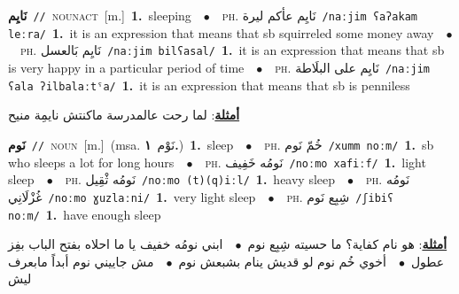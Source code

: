 \documentclass[10pt,a4paper,twoside]{article} %
\begin{document}
\begin{multicols}{2}
{\setlength\topsep{0pt}\textbf{\foreignlanguage{arabic}{نَايِم}}\ {\color{gray}\texttt{//}\color{black}}\ \textsc{noun\textunderscore act}\ [m.]\ \textbf{1.}~sleeping\ \ $\bullet$\ \ \textsc{ph.} \color{gray} \foreignlanguage{arabic}{نَايِم عأكم ليرة}\color{black}\ {\color{gray}\texttt{/{\sffamily naːjim ʕaʔakam leːra}/}\color{black}}\ \textbf{1.}~it is an expression that means that sb squirreled some money away\ \ $\bullet$\ \ \textsc{ph.} \color{gray} \foreignlanguage{arabic}{نَايِم بَالعسل}\color{black}\ {\color{gray}\texttt{/{\sffamily naːjim bilʕasal}/}\color{black}}\ \textbf{1.}~it is an expression that means that sb is very happy in a particular period of time\ \ $\bullet$\ \ \textsc{ph.} \color{gray} \foreignlanguage{arabic}{نَايِم على البلَاطة}\color{black}\ {\color{gray}\texttt{/{\sffamily naːjim ʕala ʔilbalaːtˤa}/}\color{black}}\ \textbf{1.}~it is an expression that means that sb is penniless\  \begin{flushright}\color{gray}\foreignlanguage{arabic}{\textbf{\underline{\foreignlanguage{arabic}{أمثلة}}}: لما رحت عالمدرسة ماكنتش نايمِة منيح}\end{flushright}\color{black}} \vspace{2mm}

{\setlength\topsep{0pt}\textbf{\foreignlanguage{arabic}{نَوم}}\ {\color{gray}\texttt{//}\color{black}}\ \textsc{noun}\ [m.]\ \color{gray}(msa. \foreignlanguage{arabic}{نَوْم}~\foreignlanguage{arabic}{\textbf{١.}})\color{black}\ \textbf{1.}~sleep\ \ $\bullet$\ \ \textsc{ph.} \color{gray} \foreignlanguage{arabic}{خُمّ نَوم}\color{black}\ {\color{gray}\texttt{/{\sffamily xumm noːm}/}\color{black}}\ \textbf{1.}~sb who sleeps a lot for long hours\ \ $\bullet$\ \ \textsc{ph.} \color{gray} \foreignlanguage{arabic}{نَومُه خَفِيف}\color{black}\ {\color{gray}\texttt{/{\sffamily noːmo xafiːf}/}\color{black}}\ \textbf{1.}~light sleep\ \ $\bullet$\ \ \textsc{ph.} \color{gray} \foreignlanguage{arabic}{نَومُه ثْقِيل}\color{black}\ {\color{gray}\texttt{/{\sffamily noːmo (t)(q)iːl}/}\color{black}}\ \textbf{1.}~heavy sleep\ \ $\bullet$\ \ \textsc{ph.} \color{gray} \foreignlanguage{arabic}{نَومُه غُزْلَانِي}\color{black}\ {\color{gray}\texttt{/{\sffamily noːmo ɣuzlaːni}/}\color{black}}\ \textbf{1.}~very light sleep\ \ $\bullet$\ \ \textsc{ph.} \color{gray} \foreignlanguage{arabic}{شِبِع نَوم}\color{black}\ {\color{gray}\texttt{/{\sffamily ʃibiʕ noːm}/}\color{black}}\ \textbf{1.}~have enough sleep\  \begin{flushright}\color{gray}\foreignlanguage{arabic}{\textbf{\underline{\foreignlanguage{arabic}{أمثلة}}}: هو نام كفاية؟ ما حسيته شِبِع نوم\ $\bullet$\ \  ابني نومُه خفيف يا ما احلاه بفتح الباب بفِز عطول\ $\bullet$\ \  أخوي خُم نوم لو قديش ينام بشبعش نوم\ $\bullet$\ \  مش جاييني نوم أبداً مابعرف ليش}\end{flushright}\color{black}} \vspace{2mm}


\end{multicols}
\end{document}
